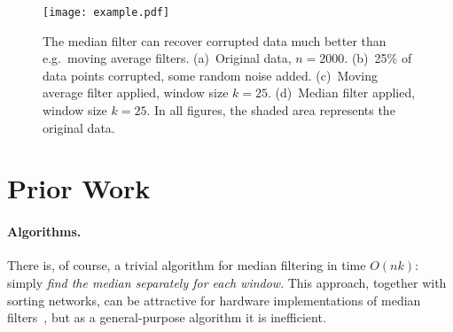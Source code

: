 \documentclass[a4paper,11pt]{article}
\begin{document}
\begin{figure}
    \centering
    \texttt{[image: example.pdf]}
    \caption{The median filter can recover corrupted data much better than e.g.\ moving average filters. (a)~Original data, $n=2000$. (b)~25\% of data points corrupted, some random noise added. (c)~Moving average filter applied, window size $k=25$. (d)~Median filter applied, window size $k=25$. In all figures, the shaded area represents the original data.}\label{fig:example}
\end{figure}

\section{Prior Work}

\paragraph{Algorithms.}

There is, of course, a trivial algorithm for median filtering in time $O(n k)$: simply \emph{find the median separately for each window}. This approach, together with sorting networks, can be attractive for hardware implementations of median filters~\cite{oflazer83median}, but as a general-purpose algorithm it is inefficient.
\end{document}
